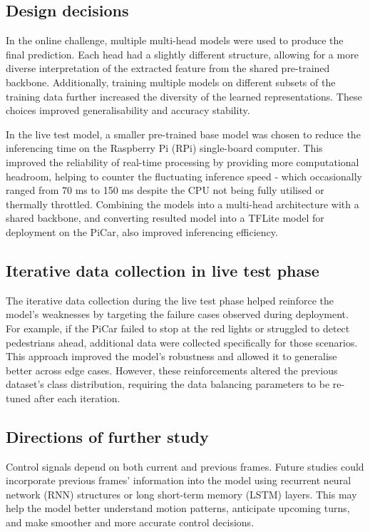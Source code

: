 \documentclass{article}
\begin{document}
\subsection{Design decisions}
In the online challenge, multiple multi-head models were used to produce the final prediction. Each head had a slightly different structure, allowing for a more diverse interpretation of the extracted feature from the shared pre-trained backbone. Additionally, training multiple models on different subsets of the training data further increased the diversity of the learned representations. These choices improved generalisability and accuracy stability.

In the live test model, a smaller pre-trained base model was chosen to reduce the inferencing time on the Raspberry Pi (RPi) single-board computer. This improved the reliability of real-time processing by providing more computational headroom, helping to counter the fluctuating inference speed - which occasionally ranged from 70 ms to 150 ms despite the CPU not being fully utilised or thermally throttled. Combining the models into a multi-head architecture with a shared backbone, and converting resulted model into a TFLite model for deployment on the PiCar, also improved inferencing efficiency.

\subsection{Iterative data collection in live test phase}
The iterative data collection during the live test phase helped reinforce the model's weaknesses by targeting the failure cases observed during deployment. For example, if the PiCar failed to stop at the red lights or struggled to detect pedestrians ahead, additional data were collected specifically for those scenarios. This approach improved the model's robustness and allowed it to generalise better across edge cases. However, these reinforcements altered the previous dataset's class distribution, requiring the data balancing parameters to be re-tuned after each iteration.

\subsection{Directions of further study}
Control signals depend on both current and previous frames. Future studies could incorporate previous frames' information into the model using recurrent neural network (RNN) structures or long short-term memory (LSTM) layers. This may help the model better understand motion patterns, anticipate upcoming turns, and make smoother and more accurate control decisions.
\end{document}
